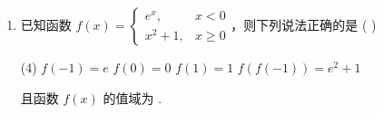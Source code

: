 \documentclass[11pt,a4paper]{article}
\begin{document}
\begin{enumerate}[label=\textbf{题 \arabic*}]

\item 已知函数 \( f(x) = \begin{cases} e^x, & x < 0 \\ x^2 + 1, & x \geq 0 \end{cases} \)，则下列说法正确的是 ( \quad )

\begin{tasks}(4)
    \task \( f(-1) = e \)
    \task \( f(0) = 0 \)
    \task \( f(1) = 1 \)
    \task \( f(f(-1)) = e^2 + 1 \)
\end{tasks}

且函数 \( f(x) \) 的值域为 \underline{\hspace{2cm}}.

\end{enumerate}
\end{document}
